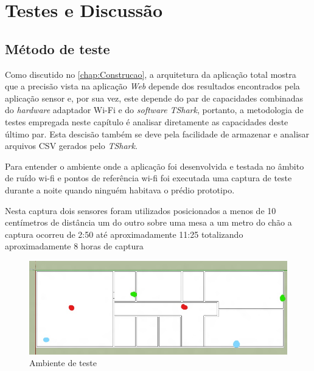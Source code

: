 \chapter{Testes e Discussão}
\label{chap:Testes}

\section{Método de teste}
\label{sec:metodo-teste}

Como discutido no \autoref{chap:Construcao}, a arquitetura da aplicação total
mostra que a precisão vista na aplicação \emph{Web} depende dos resultados
encontrados pela aplicação sensor e, por sua vez, este depende do par de
capacidades combinadas do \emph{hardware} adaptador Wi-Fi e do \emph{software}
\emph{TShark}, portanto, a metodologia de testes empregada neste capítulo é
analisar diretamente as capacidades deste último par. Esta descisão também se
deve pela facilidade de armazenar e analisar arquivos CSV gerados pelo
\emph{TShark}.

Para entender  o ambiente onde a aplicação foi desenvolvida e testada no âmbito
de ruído wi-fi e pontos de referência wi-fi foi executada uma captura de teste
durante a noite quando ninguém habitava o prédio prototipo.

Nesta captura dois sensores foram utilizados posicionados a menos de 10 centímetros
de distância um do outro sobre uma mesa a um metro do chão a captura ocorreu de 2:50
até aproximadamente 11:25 totalizando aproximadamente 8 horas de captura

\begin{figure}[htb]
	\caption{\label{fig-planta-baixa}Ambiente de teste}
	\begin{center}
		\includegraphics[width=1\textwidth]{060-testes/data-analisis/planta-baixa_Ink_LI.jpg}
	\end{center}
\end{figure}


